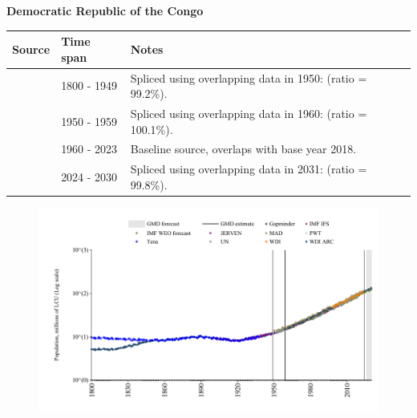 \documentclass[12pt,a4paper,landscape]{article}
\begin{document}
\begin{adjustbox}{max totalsize={\paperwidth}{\paperheight},center}
\begin{minipage}[t][\textheight][t]{\textwidth}
\vspace*{0.5cm}
{}
\begin{center}
{\Large\bfseries Democratic Republic of the Congo}
\end{center}
\vspace{0.5cm}
\begin{table}[H]
\centering
\small
\begin{tabular}{|l|l|l|}
\hline
\textbf{Source} & \textbf{Time span} & \textbf{Notes} \\
\hline
\rowcolor{white}\cite{Gapminder}& 1800 - 1949 &Spliced using overlapping data in 1950: (ratio = 99.2\%).\\
\rowcolor{lightgray}\cite{IMF_IFS}& 1950 - 1959 &Spliced using overlapping data in 1960: (ratio = 100.1\%).\\
\rowcolor{white}\cite{WDI}& 1960 - 2023 &Baseline source, overlaps with base year 2018.\\
\rowcolor{lightgray}\cite{Gapminder}& 2024 - 2030 &Spliced using overlapping data in 2031: (ratio = 99.8\%).\\
\hline
\end{tabular}
\end{table}
\begin{figure}[H]
\centering
\includegraphics[width=\textwidth,height=0.6\textheight,keepaspectratio]{graphs/COD_pop.pdf}
\end{figure}
\end{minipage}
\end{adjustbox}
\end{document}
